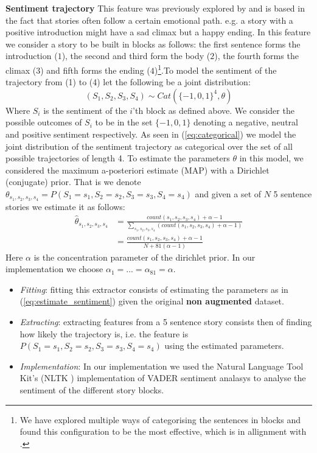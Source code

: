 \documentclass{article}
\begin{document}
\textbf{Sentiment trajectory} This feature was previously explored by \cite{COGCOMP} and is based in the fact that stories often follow a certain emotional path. e.g. a story with a positive introduction might have a sad climax but a happy ending. In this feature we consider a story to be built in blocks as follows: the first sentence forms the introduction ($1$), the second and third form the body ($2$), the fourth forms the climax ($3$) and fifth forms the ending ($4$)\footnote{We have explored multiple ways of categorising the sentences in blocks and found this configuration to be the most effective, which is in allignment with \cite{COGCOMP}.}.To model the sentiment of the trajectory from (1) to (4) let the following be a joint distribution:
\begin{equation}
\label{eq:categorical}
(S_1, S_2,S_3,S_4) \sim Cat(\{-1,0,1\}^4, \theta)
\end{equation}
Where $S_i$ is the sentiment of the $i$'th block as defined above. We consider the possible outcomes of $S_i$ to be in the set $\{-1,0,1\}$ denoting a negative, neutral and positive sentiment respectively.  As seen in (\ref{eq:categorical}) we model the joint distribution of the sentiment trajectory as categorical over the set of all possible trajectories of length 4. To estimate the parameters $\theta$ in this model, we considered the maximum a-posteriori estimate (MAP) with a Dirichlet (conjugate) prior. That is we denote $\theta_{s_1,s_2,s_3,s_4} = P(S_1 = s_1, S_2=s_2, S_3=s_3, S_4=s_4)$ and given a set of $N$ 5 sentence stories we estimate it as follows:
\begin{equation}
\label{eq:estimate_sentiment}
\begin{split}
\hat{\theta}_{s_1,s_2,s_3,s_4} &= \frac{count(s_1,s_2,s_3,s_4) + \alpha - 1}{\sum\limits_{s_1,s_2,s_3,s_4}(count(s_1,s_2,s_3,s_4) + \alpha-1) }\\
&=\frac{count(s_1,s_2,s_3,s_4) + \alpha - 1}{N + 81(\alpha-1) }
\end{split}
\end{equation}
Here $\alpha$ is the concentration parameter of the dirichlet prior. In our implementation we choose $\alpha_1 = ... = \alpha_{81} = \alpha$.
\begin{itemize}
	\item \textit{Fitting}: fitting this extractor consists of estimating the parameters as in (\ref{eq:estimate_sentiment}) given the original \textbf{non augmented} dataset.
	\item \textit{Extracting}: extracting features from a 5 sentence story consists then of finding how likely the trajectory is, i.e. the feature is $P(S_1 = s_1, S_2=s_2, S_3=s_3, S_4=s_4)$ using the estimated parameters.
	\item \textit{Implementation}: In our implementation we used the Natural Language Tool Kit's (NLTK \cite{NLTK_VADER}) implementation of VADER sentiment analasys \cite{VADER} to analyse the sentiment of the different story blocks.
\end{itemize}
\end{document}
